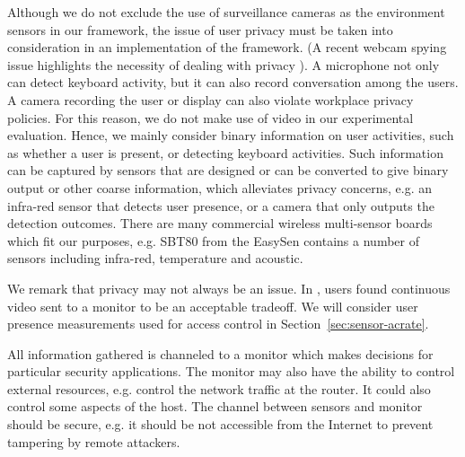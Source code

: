 Although we do not exclude the use of surveillance cameras as the
environment sensors in our framework, the issue of user privacy must
be taken into consideration in an implementation of the framework.
(A recent webcam spying issue highlights the necessity of dealing
with privacy \cite{webcam-spying}).
A microphone not only can detect keyboard activity, but it can also
record conversation among the users. A camera recording the user or
display can also violate workplace privacy policies.
For this reason,
we do not make use of video in our experimental evaluation.
Hence, we mainly consider binary information on user activities, such as
whether a user is present, or detecting keyboard activities.
Such
information can be captured by sensors that are designed or can be converted to give
binary output or other coarse information, which alleviates privacy
concerns, e.g. an infra-red sensor that detects user presence, or a
camera that only outputs the detection outcomes.
There are many commercial wireless multi-sensor
boards which fit our purposes, e.g.
SBT80 from the EasySen
\cite{EasySen} contains a number of sensors including infra-red,
temperature and acoustic.

We remark that privacy may not always be an issue.
In \cite{kwang2009usability}, users found continuous video sent to a monitor to
be an acceptable tradeoff.
We will consider user presence measurements
used for access control in Section~\ref{sec:sensor-acrate}.

All information gathered is channeled to a
monitor which makes decisions for particular security applications.
The monitor may also have the ability to control
external resources, e.g. control the network traffic at the router.
It could also control some aspects of the host.
The channel between sensors and monitor should be secure,
e.g. it should be not accessible from the Internet to prevent 
tampering by remote attackers. 

